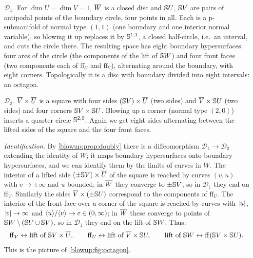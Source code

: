 \emph{$\mathcal D_1$.} For $\dim U=\dim V=1$, $\overline{W}$ is a closed disc and $\mathbb{S} U$, $\mathbb{S} V$ are
pairs of antipodal points of the boundary circle, four points in all. Each is a p-submanifold
of normal type $(1,1)$ (one boundary and one interior normal variable), so blowing it up replaces
it by $\mathbb{S}^{1,1}$, a closed half-circle, i.e.\ an interval, and cuts the circle there. The
resulting space has eight boundary hypersurfaces: four arcs of the circle (the components of the
lift of $\mathbb{S} W$) and four front faces (two components each of $\mathrm{ff}_U$ and $\mathrm{ff}_V$),
alternating around the boundary, with eight corners. Topologically it is a disc with boundary
divided into eight intervals: an octagon.

\emph{$\mathcal D_2$.} $\overline{V}\times\overline{U}$ is a square with four sides
$(\mathbb{S} V)\times\overline{U}$ (two sides) and $\overline{V}\times\mathbb{S} U$ (two sides) and four corners
$\mathbb{S} V\times\mathbb{S} U$. Blowing up a corner (normal type $(2,0)$) inserts a quarter circle
$\mathbb{S}^{2,0}$. Again we get eight sides alternating between the lifted sides of the square and
the four front faces.

\emph{Identification.} By \cref{blowup:prop:doubly} there is a diffeomorphism $\mathcal D_1\to\mathcal
D_2$ extending the identity of $W$; it maps boundary hypersurfaces onto boundary hypersurfaces,
and we can identify them by the limits of curves in $W$. The interior of a lifted side
$(\pm\mathbb{S} V)\times\overline{U}$ of the square is reached by curves $(v,u)$ with $v\to\pm\infty$ and $u$
bounded; in $\overline{W}$ they converge to $\pm\mathbb{S} V$, so in $\mathcal D_1$ they end on $\mathrm{ff}_V$.
Similarly the sides $\overline{V}\times(\pm\mathbb{S} U)$ correspond to the components of $\mathrm{ff}_U$. The
interior of the front face over a corner of the square is reached by curves with $\lvert u\rvert$,
$\lvert v\rvert\to\infty$ and $\langle u\rangle/\langle v\rangle\to c\in(0,\infty)$; in $\overline{W}$ these converge to points of
$\mathbb{S} W\setminus(\mathbb{S} U\cup\mathbb{S} V)$, so in $\mathcal D_1$ they end on the lift of $\mathbb{S} W$. Thus:
\begin{equation*}
  \mathrm{ff}_V\leftrightarrow\text{lift of }\mathbb{S} V\times\overline{U},\qquad
  \mathrm{ff}_U\leftrightarrow\text{lift of }\overline{V}\times\mathbb{S} U,\qquad
  \text{lift of }\mathbb{S} W\leftrightarrow\mathrm{ff}(\mathbb{S} V\times\mathbb{S} U).
\end{equation*}
This is the picture of \cref{blowup:fig:octagon}.

